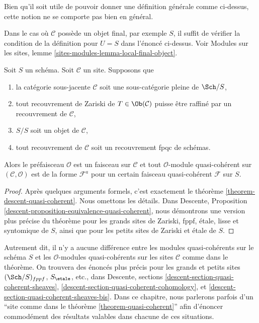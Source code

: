\noindent
Bien qu'il soit utile de pouvoir donner une d\'efinition g\'en\'erale comme ci-dessus,
cette notion ne se comporte pas bien en g\'en\'eral.

\begin{remark}
\label{remark-final-object}
Dans le cas o\`u $\mathcal{C}$ poss\`ede un objet final, par exemple $S$, il
suffit de v\'erifier la condition de la d\'efinition pour
$U = S$ dans l'\'enonc\'e ci-dessus. Voir
Modules sur les sites, lemme \ref{sites-modules-lemma-local-final-object}.
\end{remark}

\begin{theorem}
\label{theorem-quasi-coherent}
Soit $S$ un sch\'ema.
Soit $\mathcal{C}$ un site. Supposons que
\begin{enumerate}
\item la cat\'egorie sous-jacente $\mathcal{C}$ soit une
sous-cat\'egorie pleine de $\Sch/S$,
\item tout recouvrement de Zariski de $T \in \Ob(\mathcal{C})$
puisse \^etre raffin\'e par un recouvrement de $\mathcal{C}$,
\item $S/S$ soit un objet de $\mathcal{C}$,
\item tout recouvrement de $\mathcal{C}$ soit un recouvrement fpqc de sch\'emas.
\end{enumerate}
Alors le pr\'efaisceau $\mathcal{O}$ est un faisceau sur $\mathcal{C}$ et
tout $\mathcal{O}$-module quasi-coh\'erent sur $(\mathcal{C}, \mathcal{O})$
est de la forme $\mathcal{F}^a$ pour un certain faisceau quasi-coh\'erent
$\mathcal{F}$ sur $S$.
\end{theorem}

\begin{proof}
Apr\`es quelques arguments formels, c'est exactement le th\'eor\`eme
\ref{theorem-descent-quasi-coherent}. Nous omettons les d\'etails. Dans
Descente, Proposition \ref{descent-proposition-equivalence-quasi-coherent},
nous d\'emontrons une version plus pr\'ecise du th\'eor\`eme pour les
grands sites de Zariski, fppf, \'etale, lisse et syntomique de $S$,
ainsi que pour les petits sites de Zariski et \'etale de $S$.
\end{proof}

\noindent
Autrement dit, il n'y a aucune diff\'erence entre les modules quasi-coh\'erents
sur le sch\'ema $S$ et les $\mathcal{O}$-modules quasi-coh\'erents
sur les sites $\mathcal{C}$ comme dans le th\'eor\`eme. On trouvera des \'enonc\'es plus pr\'ecis
pour les grands et petits sites $(\Sch/S)_{fppf}$, $S_\etale$, etc.,
dans Descente, sections
\ref{descent-section-quasi-coherent-sheaves},
\ref{descent-section-quasi-coherent-cohomology}, et
\ref{descent-section-quasi-coherent-sheaves-bis}.
Dans ce chapitre, nous parlerons parfois d'un
``site comme dans le th\'eor\`eme \ref{theorem-quasi-coherent}''
afin d'\'enoncer commod\'ement des r\'esultats valables dans chacune de ces
situations.







